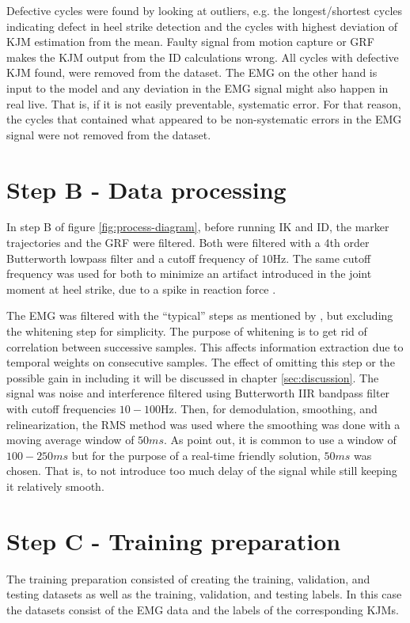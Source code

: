 \documentclass[../main.tex]{subfiles}
\begin{document}
Defective cycles were found by looking at outliers, e.g. the longest/shortest cycles indicating defect in heel strike detection and the cycles with highest deviation of \ac{KJM} estimation from the mean.
Faulty signal from motion capture or \ac{GRF} makes the \ac{KJM} output from the \ac{ID} calculations wrong.
All cycles with defective \ac{KJM} found, were removed from the dataset.
The \ac{EMG} on the other hand is input to the model and any deviation in the \ac{EMG} signal might also happen in real live.
That is, if it is not easily preventable, systematic error.
For that reason, the cycles that contained what appeared to be non-systematic errors in the \ac{EMG} signal were not removed from the dataset.

\section{Step B - Data processing}
\label{sec:data-processing}
In step B of figure \ref{fig:process-diagram}, before running \ac{IK} and \ac{ID}, the marker trajectories and the \ac{GRF} were filtered.
Both were filtered with a 4th order Butterworth lowpass filter and a cutoff frequency of $10$Hz. 
The same cutoff frequency was used for both to minimize an artifact introduced in the joint moment at heel strike, due to a spike in reaction force \cite{Kristianslund2012}.

The \ac{EMG} was filtered with the ``typical'' steps as mentioned by \textcite[99]{Clancy2016}, but excluding the whitening step for simplicity.
The purpose of whitening is to get rid of correlation between successive samples.
This affects information extraction due to temporal weights on consecutive samples.
The effect of omitting this step or the possible gain in including it will be discussed in chapter \ref{sec:discussion}.
The signal was noise and interference filtered using Butterworth IIR bandpass filter with cutoff frequencies $10-100$Hz. 
Then, for demodulation, smoothing, and relinearization, the RMS method was used where the smoothing was done with a moving average window of $50ms$. 
As \textcite{Clancy2016} point out, it is common to use a window of $100-250 ms$ but for the purpose of a real-time friendly solution, $50ms$ was chosen.
That is, to not introduce too much delay of the signal while still keeping it relatively smooth.

\section{Step C - Training preparation}
The training preparation consisted of creating the training, validation, and testing datasets as well as the training, validation, and testing labels.
In this case the datasets consist of the \ac{EMG} data and the labels of the corresponding \acp{KJM}.
\end{document}
